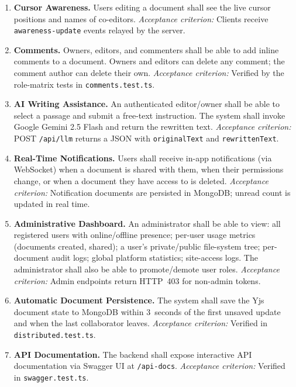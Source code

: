 \documentclass{scrartcl}
\begin{document}
\begin{enumerate}
    \item[\textbf{FR-6}] \textbf{Cursor Awareness.}
    Users editing a document shall see the live cursor positions and names of co-editors.
    \textit{Acceptance criterion:} Clients receive \texttt{awareness-update} events relayed by
    the server.

    \item[\textbf{FR-7}] \textbf{Comments.}
    Owners, editors, and commenters shall be able to add inline comments to a document. Owners
    and editors can delete any comment; the comment author can delete their own.
    \textit{Acceptance criterion:} Verified by the role-matrix tests in
    \texttt{comments.test.ts}.

    \item[\textbf{FR-8}] \textbf{AI Writing Assistance.}
    An authenticated editor/owner shall be able to select a passage and submit a free-text
    instruction. The system shall invoke Google Gemini 2.5 Flash and return the rewritten text.
    \textit{Acceptance criterion:} POST \texttt{/api/llm} returns a JSON with
    \texttt{originalText} and \texttt{rewrittenText}.

    \item[\textbf{FR-9}] \textbf{Real-Time Notifications.}
    Users shall receive in-app notifications (via WebSocket) when a document is shared with
    them, when their permissions change, or when a document they have access to is deleted.
    \textit{Acceptance criterion:} Notification documents are persisted in MongoDB; unread count
    is updated in real time.

    \item[\textbf{FR-10}] \textbf{Administrative Dashboard.}
    An administrator shall be able to view: all registered users with online/offline presence;
    per-user usage metrics (documents created, shared); a user's private/public file-system
    tree; per-document audit logs; global platform statistics; site-access logs. The
    administrator shall also be able to promote/demote user roles.
    \textit{Acceptance criterion:} Admin endpoints return HTTP~403 for non-admin tokens.

    \item[\textbf{FR-11}] \textbf{Automatic Document Persistence.}
    The system shall save the Yjs document state to MongoDB within 3~seconds of the first
    unsaved update and when the last collaborator leaves.
    \textit{Acceptance criterion:} Verified in \texttt{distributed.test.ts}.

    \item[\textbf{FR-12}] \textbf{API Documentation.}
    The backend shall expose interactive API documentation via Swagger UI at
    \texttt{/api-docs}.
    \textit{Acceptance criterion:} Verified in \texttt{swagger.test.ts}.
  \end{enumerate}
\end{document}
